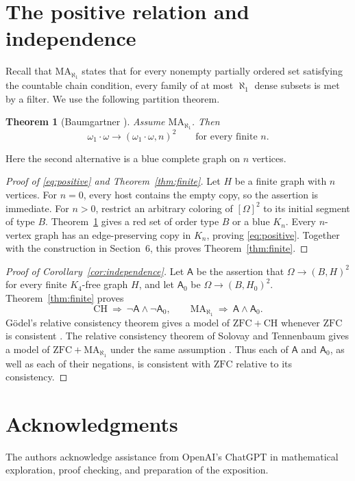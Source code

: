 \documentclass[10pt,letterpaper,leqno]{amsart}
\numberwithin{equation}{section}
\newtheorem{theorem}{Theorem}[section]
\theoremstyle{definition}
\theoremstyle{remark}
\newcommand{\Bl}{\omega_1\cdot\omega}
\newcommand{\MA}{\mathrm{MA}_{\aleph_1}}
\newcommand{\CH}{\mathrm{CH}}
\newcommand{\ZFC}{\mathrm{ZFC}}
\begin{document}
\section{The positive relation and independence}

Recall that $\MA$ states that for every nonempty partially ordered set satisfying
the countable chain condition, every family of at most $\aleph_1$ dense
subsets is met by a filter. We use the following partition theorem.

\begin{theorem}[Baumgartner {\cite[Theorem~3.5(a)]{Baumgartner}}]\label{thm:Baumgartner}
Assume $\MA$. Then
\[
 \Bl\to(\Bl,n)^2
 \qquad\text{for every finite }n.
\]
\end{theorem}

Here the second alternative is a blue complete graph on $n$ vertices.

\begin{proof}[Proof of \eqref{eq:positive} and Theorem~\ref{thm:finite}]
Let $H$ be a finite graph with $n$ vertices. For $n=0$, every host contains
the empty copy, so the assertion is immediate.
For $n>0$, restrict an arbitrary coloring of $[\Omega]^2$ to its initial
segment of type $B$. Theorem~\ref{thm:Baumgartner} gives a red set of
order type $B$ or a blue $K_n$. Every $n$-vertex graph has an
edge-preserving copy in $K_n$, proving \eqref{eq:positive}.
Together with the construction in Section~6, this proves
Theorem~\ref{thm:finite}.
\end{proof}

\begin{proof}[Proof of Corollary~\ref{cor:independence}]
Let $\mathsf A$ be the assertion that $\Omega\to(B,H)^2$ for every
finite $K_4$-free graph $H$, and let $\mathsf A_0$ be
$\Omega\to(B,H_0)^2$.
Theorem~\ref{thm:finite} proves
\[
 \CH\ \Longrightarrow\ \neg\mathsf A\wedge\neg\mathsf A_0,
 \qquad
 \MA\ \Longrightarrow\ \mathsf A\wedge\mathsf A_0.
\]
G\"odel's relative consistency theorem gives a model of
$\ZFC+\CH$ whenever $\ZFC$ is consistent \cite{Godel}.
The relative consistency theorem of Solovay and Tennenbaum gives a model
of $\ZFC+\MA$ under the same assumption \cite{ST}.
Thus each of $\mathsf A$ and $\mathsf A_0$, as well as each of their
negations, is consistent with $\ZFC$ relative to its consistency.
\end{proof}

\section*{Acknowledgments}
The authors acknowledge assistance from OpenAI's ChatGPT in mathematical
exploration, proof checking, and preparation of the exposition.
\end{document}
